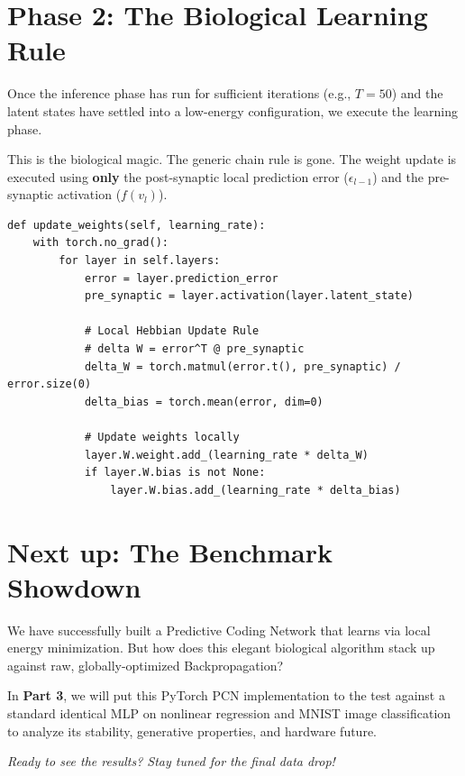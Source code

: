 \documentclass[12pt]{article}
\begin{document}
\section*{Phase 2: The Biological Learning Rule}

Once the inference phase has run for sufficient iterations (e.g., $T=50$) and the latent states have settled into a low-energy configuration, we execute the learning phase. 

This is the biological magic. The generic chain rule is gone. The weight update is executed using \textbf{only} the post-synaptic local prediction error ($\epsilon_{l-1}$) and the pre-synaptic activation ($f(v_l)$).

\begin{verbatim}
def update_weights(self, learning_rate):
    with torch.no_grad():
        for layer in self.layers:
            error = layer.prediction_error
            pre_synaptic = layer.activation(layer.latent_state)
            
            # Local Hebbian Update Rule
            # delta W = error^T @ pre_synaptic
            delta_W = torch.matmul(error.t(), pre_synaptic) / error.size(0)
            delta_bias = torch.mean(error, dim=0)

            # Update weights locally
            layer.W.weight.add_(learning_rate * delta_W)
            if layer.W.bias is not None:
                layer.W.bias.add_(learning_rate * delta_bias)
\end{verbatim}

\section*{Next up: The Benchmark Showdown}

We have successfully built a Predictive Coding Network that learns via local energy minimization. But how does this elegant biological algorithm stack up against raw, globally-optimized Backpropagation? 

In \textbf{Part 3}, we will put this PyTorch PCN implementation to the test against a standard identical MLP on nonlinear regression and MNIST image classification to analyze its stability, generative properties, and hardware future.

\vspace{1em}
\noindent \textit{Ready to see the results? Stay tuned for the final data drop!}
\end{document}
